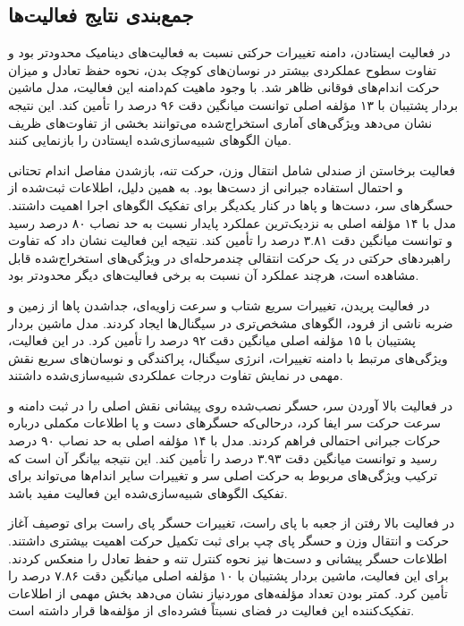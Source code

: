 \subsection{جمع‌بندی نتایج فعالیت‌ها}

در فعالیت ایستادن، دامنه تغییرات حرکتی نسبت به فعالیت‌های دینامیک محدودتر بود و تفاوت سطوح عملکردی بیشتر در نوسان‌های کوچک بدن، نحوه حفظ تعادل و میزان حرکت اندام‌های فوقانی ظاهر شد. با وجود ماهیت کم‌دامنه این فعالیت، مدل ماشین بردار پشتیبان با ۱۳ مؤلفه اصلی توانست میانگین دقت ۹۶ درصد را تأمین کند. این نتیجه نشان می‌دهد ویژگی‌های آماری استخراج‌شده می‌توانند بخشی از تفاوت‌های ظریف میان الگوهای شبیه‌سازی‌شده ایستادن را بازنمایی کنند.

فعالیت برخاستن از صندلی شامل انتقال وزن، حرکت تنه، بازشدن مفاصل اندام تحتانی و احتمال استفاده جبرانی از دست‌ها بود. به همین دلیل، اطلاعات ثبت‌شده از حسگرهای سر، دست‌ها و پاها در کنار یکدیگر برای تفکیک الگوهای اجرا اهمیت داشتند. مدل  با ۱۴ مؤلفه اصلی به نزدیک‌ترین عملکرد پایدار نسبت به حد نصاب ۸۰ درصد رسید و توانست میانگین دقت ۳.۸۱ درصد را تأمین کند. نتیجه این فعالیت نشان داد که تفاوت راهبردهای حرکتی در یک حرکت انتقالی چندمرحله‌ای در ویژگی‌های استخراج‌شده قابل مشاهده است، هرچند عملکرد آن نسبت به برخی فعالیت‌های دیگر محدودتر بود.

در فعالیت پریدن، تغییرات سریع شتاب و سرعت زاویه‌ای، جداشدن پاها از زمین و ضربه ناشی از فرود، الگوهای مشخص‌تری در سیگنال‌ها ایجاد کردند. مدل ماشین بردار پشتیبان با ۱۵ مؤلفه اصلی میانگین دقت ۹۲ درصد را تأمین کرد. در این فعالیت، ویژگی‌های مرتبط با دامنه تغییرات، انرژی سیگنال، پراکندگی و نوسان‌های سریع نقش مهمی در نمایش تفاوت درجات عملکردی شبیه‌سازی‌شده داشتند.

در فعالیت بالا آوردن سر، حسگر نصب‌شده روی پیشانی نقش اصلی را در ثبت دامنه و سرعت حرکت سر ایفا کرد، درحالی‌که حسگرهای دست و پا اطلاعات مکملی درباره حرکات جبرانی احتمالی فراهم کردند. مدل  با ۱۴ مؤلفه اصلی به حد نصاب ۹۰ درصد رسید و توانست میانگین دقت ۳.۹۳ درصد را تأمین کند. این نتیجه بیانگر آن است که ترکیب ویژگی‌های مربوط به حرکت اصلی سر و تغییرات سایر اندام‌ها می‌تواند برای تفکیک الگوهای شبیه‌سازی‌شده این فعالیت مفید باشد.

در فعالیت بالا رفتن از جعبه با پای راست، تغییرات حسگر پای راست برای توصیف آغاز حرکت و انتقال وزن و حسگر پای چپ برای ثبت تکمیل حرکت اهمیت بیشتری داشتند. اطلاعات حسگر پیشانی و دست‌ها نیز نحوه کنترل تنه و حفظ تعادل را منعکس کردند. برای این فعالیت، ماشین بردار پشتیبان با ۱۰ مؤلفه اصلی میانگین دقت ۷.۸۶ درصد را تأمین کرد. کمتر بودن تعداد مؤلفه‌های موردنیاز نشان می‌دهد بخش مهمی از اطلاعات تفکیک‌کننده این فعالیت در فضای نسبتاً فشرده‌ای از مؤلفه‌ها قرار داشته است.

